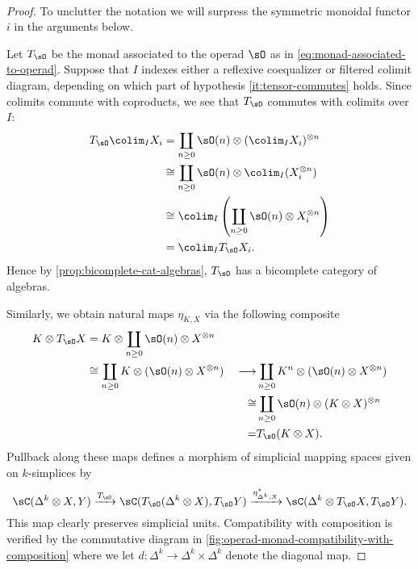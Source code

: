 \documentclass[leqno,oneside,english]{elsarticle}
\newcounter{enumisaved}
\newlength{\thmsaved}
\begin{document}
{{    {}  \ifshowcomplete
  \ 
  {
\begin{proof}
  To unclutter the notation we will surpress the symmetric monoidal
  functor $i$ in the arguments below.

  Let $T_{\sO}$ be the monad associated to the operad $\sO$ as in \eqref{eq:monad-associated-to-operad}.  Suppose that $I$ indexes either a reflexive coequalizer or filtered colimit
  diagram, depending on which part of hypothesis \eqref{it:tensor-commutes}
  holds.  Since colimits commute with coproducts, we see that
  $T_{\sO}$ commutes with colimits over $I$:
  \begin{align*}
    T_{\sO}\colim_{I} X_i  &= \coprod_{n\geq 0} \sO(n)\otimes
    (\colim_{I} X_i)^{\otimes n }\\
      &\cong \coprod_{n\geq 0} \sO(n)\otimes \colim_{I} ( X_i^{\otimes n })\\
      &\cong \colim_{I} \left(\coprod_{n\geq 0} \sO(n)\otimes
      X_i^{\otimes n}\right)\\
      &= \colim_{I} T_{\sO} X_i.
  \end{align*}
  Hence by \cref{prop:bicomplete-cat-algebras}, $T_{\sO}$ has a
  bicomplete category of algebras.

  Similarly, we obtain natural maps $\eta_{K,X}$ via the following
  composite
  \begin{alignat*}{2}
    K\otimes T_{\sO} X  & = K\otimes \coprod_{n\geq 0} \sO(n)\otimes
    X^{\otimes n } & &\\
      & \cong \coprod_{n\geq 0} K\otimes (\sO(n)\otimes X^{\otimes n
      }) 
      & \;\longrightarrow & \coprod_{n\geq 0} K^n \otimes (\sO(n)\otimes
      X^{\otimes n})\\
      & &\cong & \coprod_{n\geq 0} \sO(n)\otimes
      (K\otimes X)^{\otimes n}\\
      & & = & T_{\sO} (K\otimes X).
  \end{alignat*}
  Pullback along these maps defines a morphism of simplicial mapping spaces given
  on $k$-simplices by 
  \[
  \sC(\Delta^k\otimes X,Y) \xrightarrow{T_{\sO}}
  \sC(T_{\sO}(\Delta^k\otimes
  X),T_{\sO}Y)\xrightarrow{\eta_{\Delta^k,X}^*}\sC(\Delta^k \otimes
  T_{\sO}X, T_{\sO}Y).
  \]
  This map clearly preserves simplicial units.  Compatibility with
  composition is verified by the commutative diagram in
  \cref{fig:operad-monad-compatibility-with-composition} where we let
  $d\colon \Delta^k\rightarrow \Delta^{k}\times \Delta^{k}$ denote the
  diagonal map.


\end{proof}}}}
\end{document}
